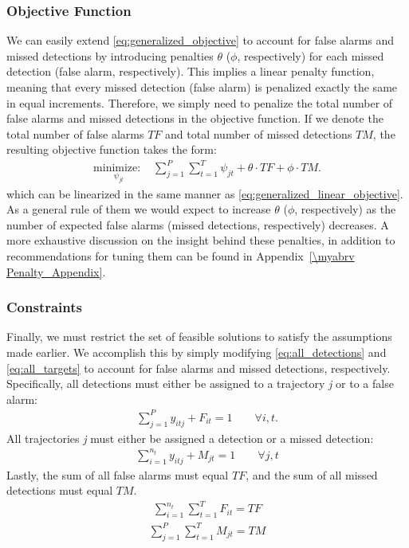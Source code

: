 \subsubsection{Objective Function}
We can easily extend \eqref{eq:generalized_objective} to account for false alarms and missed detections by introducing penalties $\theta$ ($\phi$, respectively) for each missed detection (false alarm, respectively). This implies a linear penalty function, meaning that every missed detection (false alarm) is penalized exactly the same in equal increments. Therefore, we simply need to penalize the total number of false alarms and missed detections in the objective function. If we denote the total number of false alarms $TF$ and total number of missed detections $TM$, the resulting objective function takes the form:
\begin{align}
\underset{\psi_{jt}}{\text{minimize: }} & \sum_{j=1}^{P} \sum_{t=1}^{T} \psi_{jt} + \theta \cdot TF + \phi \cdot TM.
\end{align}
which can be linearized in the same manner as \eqref{eq:generalized_linear_objective}. As a general rule of them we would expect to increase $\theta$ ($\phi$, respectively) as the number of expected false alarms (missed detections, respectively) decreases. A more exhaustive discussion on the insight behind these penalties, in addition to recommendations for tuning them can be found in Appendix~\ref{\myabrv Penalty_Appendix}.

\subsubsection{Constraints}
Finally, we must restrict the set of feasible solutions to satisfy the assumptions made earlier. We accomplish this by simply modifying \eqref{eq:all_detections} and \eqref{eq:all_targets} to account for false alarms and missed detections, respectively. Specifically, all detections must either be assigned to a trajectory \textit{j} or to a false alarm:
\begin{align}\label{eqn: FA Simple}
\sum_{j=1}^{P} y_{itj} + F_{it} = 1 \qquad \forall i,t.
\end{align}
All trajectories \textit{j} must either be assigned a detection or a missed detection:
\begin{align}
\sum_{i=1}^{n_{t}} y_{itj} + M_{jt} = 1 \qquad \forall j,t
\end{align}
Lastly, the sum of all false alarms must equal $TF$, and the sum of all missed detections must equal $TM$. 
\begin{align}
\sum_{i=1}^{n_{t}} \sum_{t=1}^{T} F_{it} = TF
\end{align}
\begin{align}\label{eqn: MD Total}
\sum_{j=1}^{P} \sum_{t=1}^{T} M_{jt} = TM 
\end{align}

